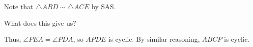 







Note that $\triangle ABD\sim\triangle ACE$ by SAS.

What does this give us?







Thus, $\angle PEA = \angle PDA$, so $APDE$ is cyclic. By similar reasoning, $ABCP$ is cyclic.




